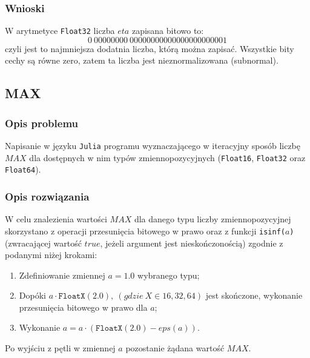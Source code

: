 \documentclass{classrep}
\begin{document}
		\subsubsection{Wnioski}
			W arytmetyce \texttt{Float32} liczba $eta$ zapisana bitowo to: $$0~00000000~00000000000000000000001$$
   			czyli jest to najmniejsza dodatnia liczba, którą można zapisać.
   			Wszystkie bity cechy są równe zero, zatem ta liczba jest nieznormalizowana (subnormal).

	\subsection{MAX}
		\subsubsection{Opis problemu}
			Napisanie w języku \texttt{Julia} programu wyznaczającego w iteracyjny sposób liczbę 
			$MAX$ dla dostępnych w nim typów zmiennopozycyjnych (\texttt{Float16}, 
			\texttt{Float32} oraz \texttt{Float64}).
		\subsubsection{Opis rozwiązania}
			W celu znalezienia wartości $MAX$ dla danego typu liczby zmiennopozycyjnej skorzystano
			z operacji przesunięcia bitowego w prawo oraz z funkcji \texttt{isinf($a$)} (zwracającej wartość 
			$true$, jeżeli argument jest nieskończonością) zgodnie z podanymi niżej 
			krokami:
			\begin{enumerate}
				\item Zdefiniowanie zmiennej $a = 1.0$ wybranego typu;
				\item Dopóki $a \cdot \texttt{FloatX}(2.0), ~(gdzie ~X \in {16,32,64})$ jest skończone, wykonanie przesunięcia bitowego w prawo dla $a$;
				\item Wykonanie $a = a \cdot (\texttt{FloatX}(2.0) - eps(a))$.
			\end{enumerate}
			Po wyjściu z pętli w zmiennej $a$ pozostanie żądana wartość $MAX$.	
\end{document}
